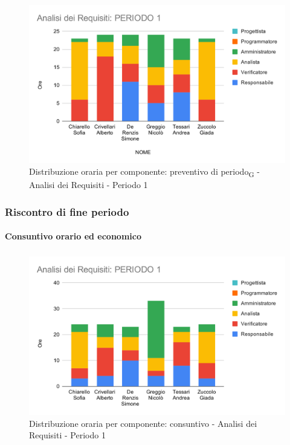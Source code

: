 \begin{figure}[H]
	\centering
	\includegraphics[scale=2]{res/images/charts/preventivo/analisi_1.png}
	\caption{Distribuzione oraria per componente: preventivo di periodo\textsubscript{G} - Analisi dei Requisiti - Periodo 1}
\end{figure}


\subsubsection{Riscontro di fine periodo}


\paragraph{Consuntivo orario ed economico}
\subparagraph*{}

\contabilitaTable{
	
}

\begin{figure}[H]
	\centering
	\includegraphics[scale=2]{res/images/charts/consuntivo/analisi_1.png}
	\caption{Distribuzione oraria per componente: consuntivo - Analisi dei Requisiti - Periodo 1}
\end{figure}

